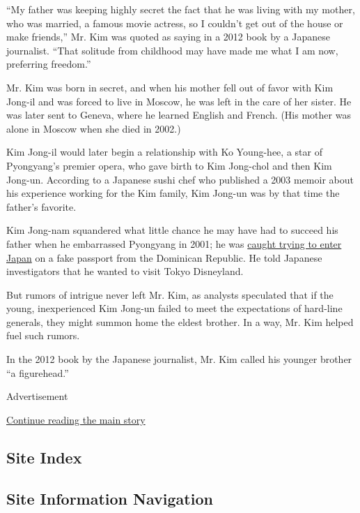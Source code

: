 ``My father was keeping highly secret the fact that he was living with
my mother, who was married, a famous movie actress, so I couldn't get
out of the house or make friends,'' Mr. Kim was quoted as saying in a
2012 book by a Japanese journalist. ``That solitude from childhood may
have made me what I am now, preferring freedom.''

Mr. Kim was born in secret, and when his mother fell out of favor with
Kim Jong-il and was forced to live in Moscow, he was left in the care of
her sister. He was later sent to Geneva, where he learned English and
French. (His mother was alone in Moscow when she died in 2002.)

Kim Jong-il would later begin a relationship with Ko Young-hee, a star
of Pyongyang's premier opera, who gave birth to Kim Jong-chol and then
Kim Jong-un. According to a Japanese sushi chef who published a 2003
memoir about his experience working for the Kim family, Kim Jong-un was
by that time the father's favorite.

Kim Jong-nam squandered what little chance he may have had to succeed
his father when he embarrassed Pyongyang in 2001; he was
\href{http://www.nytimes.com/2001/05/04/world/japan-deports-man-said-to-be-north-korean-leader-s-son.html}{caught
trying to enter Japan} on a fake passport from the Dominican Republic.
He told Japanese investigators that he wanted to visit Tokyo Disneyland.

But rumors of intrigue never left Mr. Kim, as analysts speculated that
if the young, inexperienced Kim Jong-un failed to meet the expectations
of hard-line generals, they might summon home the eldest brother. In a
way, Mr. Kim helped fuel such rumors.

In the 2012 book by the Japanese journalist, Mr. Kim called his younger
brother ``a figurehead.''

Advertisement

\protect\hyperlink{after-bottom}{Continue reading the main story}

\hypertarget{site-index}{%
\subsection{Site Index}\label{site-index}}

\hypertarget{site-information-navigation}{%
\subsection{Site Information
Navigation}\label{site-information-navigation}}

